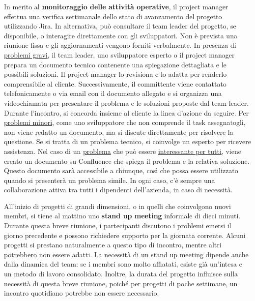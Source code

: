         In merito al \textbf{monitoraggio delle attività operative}, il project manager effettua una verifica settimanale dello stato di avanzamento del progetto utilizzando Jira.
        In alternativa, può consultare il team leader del progetto, se disponibile, o interagire direttamente con gli sviluppatori. Non è prevista una riunione fissa e gli
        aggiornamenti vengono forniti verbalmente. In presenza di \underline{problemi gravi}, il team leader, uno sviluppatore esperto o il project manager prepara un
        documento tecnico contenente una spiegazione dettagliata e le possibili soluzioni. Il project manager lo revisiona e lo adatta per renderlo comprensibile
        al cliente. Successivamente, il committente viene contattato telefonicamente o via email con il documento allegato e si organizza una videochiamata per
        presentare il problema e le soluzioni proposte dal team leader. Durante l'incontro, si concorda insieme al cliente la linea d'azione da seguire.
        Per \underline{problemi minori}, come uno sviluppatore che non comprende il task assegnatogli, non viene redatto un documento, ma si discute direttamente per
        risolvere la questione. Se si tratta di un problema tecnico, si coinvolge un esperto per ricevere assistenza. Nel caso di un \underline{problema} che può essere 
        \underline{interessante per tutti}, viene
        creato un documento su Confluence che spiega il problema e la relativa soluzione. Questo documento sarà accessibile a chiunque, così che possa essere utilizzato quando si presenterà un problema simile.
        In ogni caso, c'è sempre una collaborazione attiva tra tutti i dipendenti dell’azienda, in caso di necessità.

        All'inizio di progetti di grandi dimensioni, o in quelli che coinvolgono nuovi membri, si tiene al mattino uno \textbf{stand up meeting} informale di dieci minuti.
        Durante questa breve riunione, i partecipanti discutono i problemi emersi il giorno precedente e possono richiedere supporto per la giornata corrente. Alcuni
        progetti si prestano naturalmente a questo tipo di incontro, mentre altri potrebbero non essere adatti. La necessità di un stand up meeting dipende anche
        dalla dinamica del team: se i membri sono molto affiatati, esiste già un'intesa e un metodo di lavoro consolidato. Inoltre, la durata del progetto influisce
        sulla necessità di questa breve riunione, poiché per progetti di poche settimane, un incontro quotidiano potrebbe non essere necessario.

